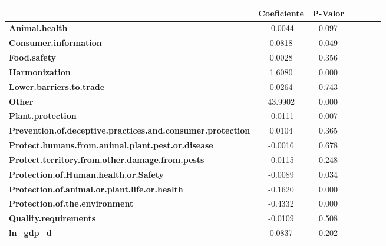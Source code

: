 \begin{table}[ht]
    \begin{center}
            
            \begin{tabular}{lcccccc}
                & \textbf{Coeficiente} &\textbf{P-Valor}\\
    \midrule
    \textbf{Animal.health}                                             &      -0.0044 &        0.097       \\
    \textbf{Consumer.information}                                      &       0.0818 &        0.049       \\
    \textbf{Food.safety}                                               &       0.0028 &        0.356       \\
    \textbf{Harmonization}                                             &       1.6080 &        0.000       \\
    \textbf{Lower.barriers.to.trade}                                   &       0.0264 &        0.743       \\
    \textbf{Other}                                                     &      43.9902 &        0.000       \\
    \textbf{Plant.protection}                                          &      -0.0111 &        0.007       \\
    \textbf{Prevention.of.deceptive.practices.and.consumer.protection} &       0.0104 &        0.365       \\
    \textbf{Protect.humans.from.animal.plant.pest.or.disease}          &      -0.0016 &        0.678       \\
    \textbf{Protect.territory.from.other.damage.from.pests}            &      -0.0115 &        0.248       \\
    \textbf{Protection.of.Human.health.or.Safety}                      &      -0.0089 &        0.034       \\
    \textbf{Protection.of.animal.or.plant.life.or.health}              &      -0.1620 &        0.000       \\
    \textbf{Protection.of.the.environment}                             &      -0.4332 &        0.000       \\
    \textbf{Quality.requirements}                                      &      -0.0109 &        0.508       \\
    \textbf{ln\_gdp\_d}                                                &       0.0837 &        0.202       \\

\end{tabular}
\end{center}
\end{table}

